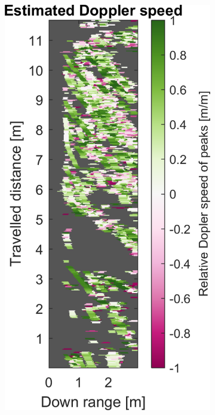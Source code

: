 \begin{figure}[htbp]
\begin{subfigure}[t]{0.475\linewidth}
    \end{subfigure}%
    \hfill%
    \begin{subfigure}[t]{0.475\linewidth}
        \centering
        \includegraphics[width=\linewidth,max height=.475\textheight]{gfx/results/homecinema_doppler.png}
    \end{subfigure}\bigskip\\

\end{figure}
